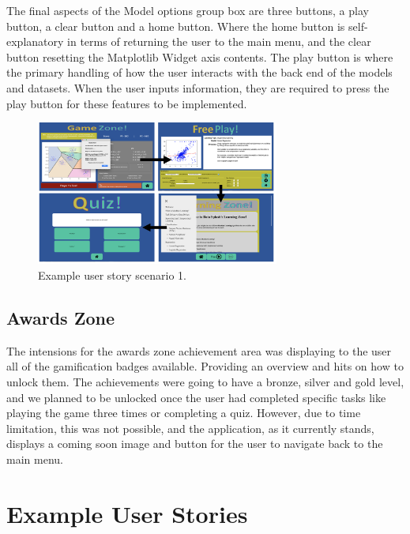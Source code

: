 		The final aspects of the Model options group box are three buttons, a play button, a clear button and a home button. Where the home button is self-explanatory in terms of returning the user to the main menu, and the clear button resetting the Matplotlib Widget axis contents. The play button is where the primary handling of how the user interacts with the back end of the models and datasets. When the user inputs information, they are required to press the play button for these features to be implemented.
	
	
	\begin{figure}[b]
		\begin{center}
			\includegraphics[width=8cm]{graphics/player_example_1.png}
			\caption{Example user story scenario 1.}
			\label{fig:user_story_1}
		\end{center}
	\end{figure}
	
	
	\subsection{Awards Zone}
	
	The intensions for the awards zone achievement area was displaying to the user all of the gamification badges available. Providing an overview and hits on how to unlock them. The achievements were going to have a bronze, silver and gold level, and we planned to be unlocked once the user had completed specific tasks like playing the game three times or completing a quiz. However, due to time limitation, this was not possible, and the application, as it currently stands, displays a coming soon image and button for the user to navigate back to the main menu.
	
	

	\section{Example User Stories}
	\label{sec:user_stories}
	
		
	
